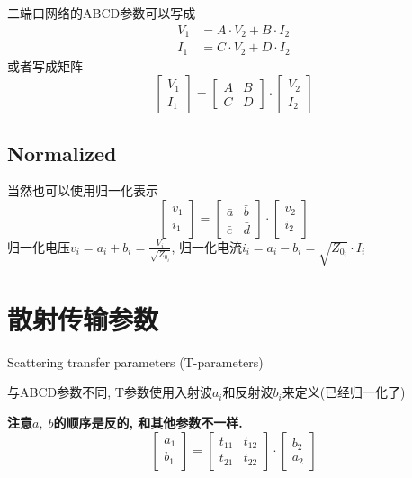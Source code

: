 \documentclass[a4paper]{report}
\begin{document}
二端口网络的ABCD参数可以写成
\begin{align*}
  V_1&=A\cdot V_2+B\cdot I_2
  \\ I_1&=C\cdot V_2+D\cdot I_2
\end{align*}
或者写成矩阵
\[
  \begin{bmatrix}
    V_1\\
    I_1
  \end{bmatrix}
  =
  \begin{bmatrix}
    A&B\\
    C&D
  \end{bmatrix}
  \cdot
  \begin{bmatrix}
    V_2\\
    I_2
  \end{bmatrix}
\]
\subsection{Normalized}
当然也可以使用归一化表示
\[
  \begin{bmatrix}
    v_1\\
    i_1
  \end{bmatrix}
  =
  \begin{bmatrix}
    \bar{a}&\bar{b}\\
    \bar{c}&\bar{d}
  \end{bmatrix}
  \cdot
  \begin{bmatrix}
    v_2\\
    i_2
  \end{bmatrix}
\]
归一化电压$v_i=a_i+b_i=\frac{V_i}{\sqrt{Z_{0_i}}}$, 归一化电流$i_i=a_i-b_i=\sqrt{Z_{0_i}}\cdot I_i$


\section{散射传输参数}
Scattering transfer parameters (T-parameters)

与ABCD参数不同, T参数使用入射波$a_i$和反射波$b_i$来定义(已经归一化了)

\textbf{注意}$a,\; b$\textbf{的顺序是反的, 和其他参数不一样. }
\[
  \begin{bmatrix}
    a_1\\
    b_1
  \end{bmatrix}
  =
  \begin{bmatrix}
    t_{11}&t_{12}\\
    t_{21}&t_{22}
  \end{bmatrix}
  \cdot
  \begin{bmatrix}
    b_2\\
    a_2
  \end{bmatrix}
\]
\end{document}

